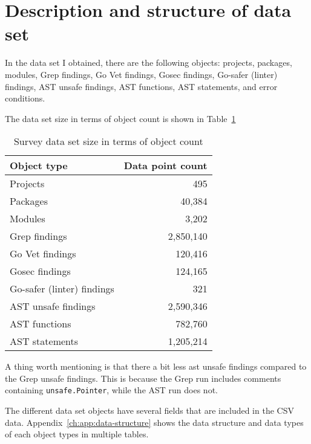
\section{Description and structure of data set}\label{sec:survey-dataset}

In the data set I obtained, there are the following objects: projects, packages, modules,  Grep findings, Go Vet findings,
Gosec findings, Go-safer (linter) findings, AST unsafe findings, AST functions, AST statements, and error conditions.

The data set size in terms of object count is shown in Table~\ref{tbl:survey-dataset-size}

\begin{table}[h]
    \centering
    \caption{Survey data set size in terms of object count}
    \label{tbl:survey-dataset-size}
    \begin{tabular}{lr}
        \toprule
        Object type & Data point count \\
        \midrule
        Projects & 495 \\
        Packages & 40,384 \\
        Modules & 3,202 \\
        Grep findings & 2,850,140 \\
        Go Vet findings & 120,416 \\
        Gosec findings & 124,165 \\
        Go-safer (linter) findings & 321 \\
        AST unsafe findings & 2,590,346 \\
        AST functions & 782,760 \\
        AST statements & 1,205,214 \\
        \bottomrule
    \end{tabular}
\end{table}

A thing worth mentioning is that there a bit less \acrshort{ast} unsafe findings compared to the Grep unsafe findings.
This is because the Grep run includes comments containing \texttt{unsafe.Pointer}, while the AST run does not.

The different data set objects have several fields that are included in the CSV data.
Appendix~\ref{ch:app:data-structure} shows the data structure and data types of each object types in multiple tables.



